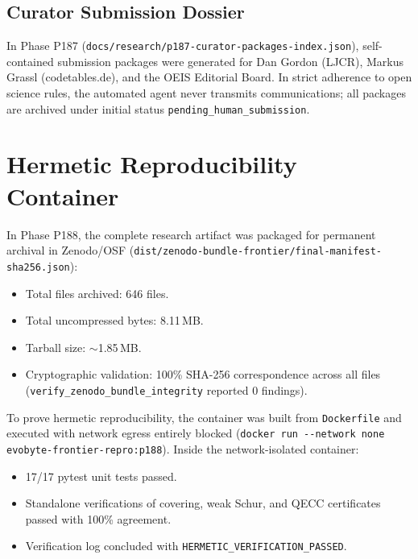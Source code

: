 \documentclass[11pt,a4paper]{article}
\begin{document}
\subsection{Curator Submission Dossier}
In Phase P187 (\texttt{docs/research/p187-curator-packages-index.json}), self-contained submission packages were generated for Dan Gordon (LJCR), Markus Grassl (codetables.de), and the OEIS Editorial Board. In strict adherence to open science rules, the automated agent never transmits communications; all packages are archived under initial status \texttt{pending\_human\_submission}.

\section{Hermetic Reproducibility Container}
\label{sec:reproducibility}
In Phase P188, the complete research artifact was packaged for permanent archival in Zenodo/OSF (\texttt{dist/zenodo-bundle-frontier/final-manifest-sha256.json}):
\begin{itemize}
    \item Total files archived: 646 files.
    \item Total uncompressed bytes: 8.11\,MB.
    \item Tarball size: $\sim$1.85\,MB.
    \item Cryptographic validation: 100\% SHA-256 correspondence across all files (\texttt{verify\_zenodo\_bundle\_integrity} reported 0 findings).
\end{itemize}
To prove hermetic reproducibility, the container was built from \texttt{Dockerfile} and executed with network egress entirely blocked (\texttt{docker run -{}-network none evobyte-frontier-repro:p188}). Inside the network-isolated container:
\begin{itemize}
    \item 17/17 pytest unit tests passed.
    \item Standalone verifications of covering, weak Schur, and QECC certificates passed with 100\% agreement.
    \item Verification log concluded with \texttt{HERMETIC\_VERIFICATION\_PASSED}.
\end{itemize}
\end{document}
